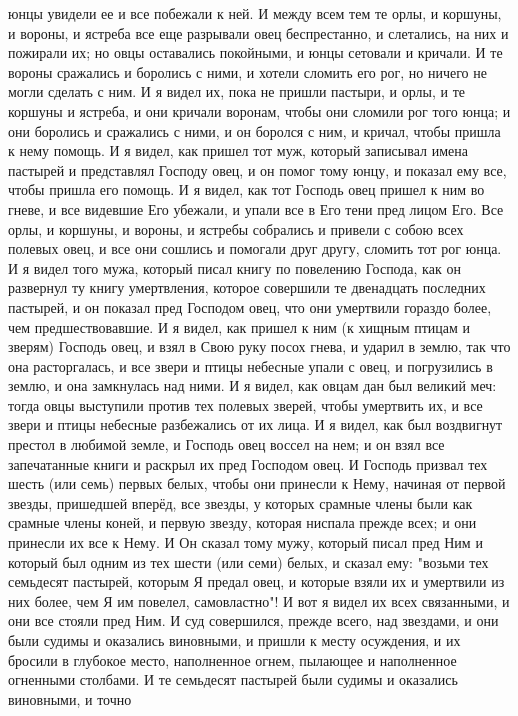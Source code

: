 юнцы увидели ее и все побежали к ней.
И между всем тем те орлы, и коршуны, и вороны, и ястреба все еще
разрывали овец беспрестанно, и слетались, на них и пожирали их; но овцы
оставались покойными, и юнцы сетовали и кричали.
И те вороны сражались и боролись с ними, и хотели сломить его рог, но
ничего не могли сделать с ним.
И я видел их, пока не пришли пастыри, и орлы, и те коршуны и ястреба,
и они кричали воронам, чтобы они сломили рог того юнца; и они боролись и
сражались с ними, и он боролся с ним, и кричал, чтобы пришла к нему помощь.
И я видел, как пришел тот муж, который записывал имена пастырей и
представлял Господу овец, и он помог тому юнцу, и показал ему все, чтобы пришла
его помощь.
И я видел, как тот Господь овец пришел к ним во гневе, и все видевшие
Его убежали, и упали все в Его тени пред лицом Его.
Все орлы, и коршуны, и вороны, и ястребы собрались и привели с собою
всех полевых овец, и все они сошлись и помогали друг другу, сломить тот рог
юнца.
И я видел того мужа, который писал книгу по повелению Господа, как он
развернул ту книгу умертвления, которое совершили те двенадцать последних
пастырей, и он показал пред Господом овец, что они умертвили гораздо более, чем
предшествовавшие.
И я видел, как пришел к ним (к хищным птицам и зверям) Господь овец,
и взял в Свою руку посох гнева, и ударил в землю, так что она расторгалась, и
все звери и птицы небесные упали с овец, и погрузились в землю, и она
замкнулась над ними.
И я видел, как овцам дан был великий меч: тогда овцы выступили против
тех полевых зверей, чтобы умертвить их, и все звери и птицы небесные
разбежались от их лица.
И я видел, как был воздвигнут престол в любимой земле, и Господь овец
воссел на нем; и он взял все запечатанные книги и раскрыл их пред Господом
овец.
И Господь призвал тех шесть (или семь) первых белых, чтобы они
принесли к Нему, начиная от первой звезды, пришедшей вперёд, все звезды, у
которых срамные члены были как срамные члены коней, и первую звезду, которая
ниспала прежде всех; и они принесли их все к Нему.
И Он сказал тому мужу, который писал пред Ним и который был одним из
тех шести (или семи) белых, и сказал ему: "возьми тех семьдесят пастырей,
которым Я предал овец, и которые взяли их и умертвили из них более, чем Я им
повелел, самовластно"!
И вот я видел их всех связанными, и они все стояли пред Ним.
И суд совершился, прежде всего, над звездами, и они были судимы и
оказались виновными, и пришли к месту осуждения, и их бросили в глубокое место,
наполненное огнем, пылающее и наполненное огненными столбами.
И те семьдесят пастырей были судимы и оказались виновными, и точно
